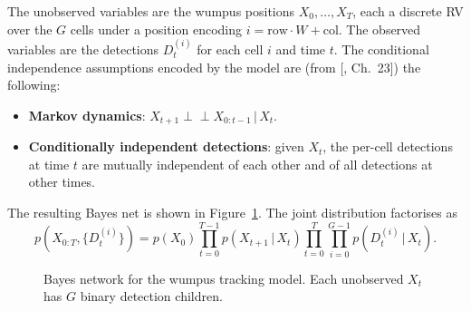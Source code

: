 \documentclass[11pt, a4paper]{article}
\newcommand{\given}{\,\vert\,}
\newcommand{\cind}{\perp\!\!\!\perp}
\begin{document}
The unobserved variables are the wumpus positions $X_0, \ldots, X_T$, each a
discrete RV over the $G$ cells under a position encoding    
$i = \text{row} \cdot W + \text{col}$. The observed variables are the
detections $D_t^{(i)}$ for each cell $i$ and time $t$.
The conditional independence assumptions encoded by the model are (from [\cite{barber2012bayesian}, Ch.~23]) the following:
\begin{itemize}
\item \textbf{Markov dynamics}: $X_{t+1} \cind X_{0:t-1} \given X_t$.
\item \textbf{Conditionally independent detections}: given $X_t$, the
per-cell detections at time $t$ are mutually independent of each other and
of all detections at other times.
\end{itemize}
The resulting Bayes net is shown in Figure~\ref{fig:bn}. The joint distribution
factorises as
\begin{equation}
p(X_{0:T}, \{D_t^{(i)}\})
= p(X_0) \prod_{t=0}^{T-1} p(X_{t+1} \given X_t)
\prod_{t=0}^{T}\prod_{i=0}^{G-1} p(D_t^{(i)} \given X_t).
\label{eq:joint}
\end{equation}

\begin{figure}[ht]
\centering
{}
\caption{Bayes network for the wumpus tracking model. Each unobserved $X_t$
has $G$ binary detection children.}
\label{fig:bn}
\end{figure}
\end{document}
